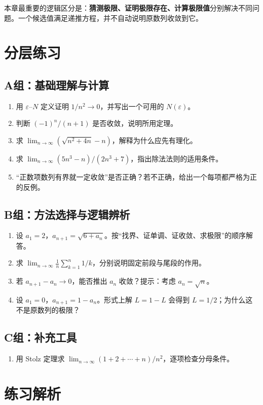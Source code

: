 \documentclass[UTF8,fontset=fandol,12pt,oneside,openany]{ctexrep}
\theoremstyle{definition}
\begin{document}
本章最重要的逻辑区分是：\textbf{猜测极限、证明极限存在、计算极限值}分别解决不同问题。一个候选值满足递推方程，并不自动说明原数列收敛到它。


\section{分层练习}
\subsection*{A组：基础理解与计算}
\begin{enumerate}[label=A\arabic*.]
\item 用 $\varepsilon$--$N$ 定义证明 $1/n^2\to0$，并写出一个可用的 $N(\varepsilon)$。
\item 判断 $(-1)^n/(n+1)$ 是否收敛，说明所用定理。
\item 求 $\lim_{n\to\infty}(\sqrt{n^2+4n}-n)$，解释为什么应先有理化。
\item 求 $\lim_{n\to\infty}(5n^3-n)/(2n^3+7)$，指出除法法则的适用条件。
\item “正数项数列有界就一定收敛”是否正确？若不正确，给出一个每项都严格为正的反例。
\end{enumerate}
\subsection*{B组：方法选择与逻辑辨析}
\begin{enumerate}[label=B\arabic*.]
\item 设 $a_1=2$，$a_{n+1}=\sqrt{6+a_n}$。按“找界、证单调、证收敛、求极限”的顺序解答。
\item 求 $\lim_{n\to\infty}\frac1n\sum_{k=1}^n1/k$，分别说明固定前段与尾段的作用。
\item 若 $a_{n+1}-a_n\to0$，能否推出 $a_n$ 收敛？提示：考虑 $a_n=\sqrt n$。
\item 设 $a_1=0$，$a_{n+1}=1-a_n$。形式上解 $L=1-L$ 会得到 $L=1/2$；为什么这不是原数列的极限？
\end{enumerate}
\subsection*{C组：补充工具}
\begin{enumerate}[label=C\arabic*.]
\item 用 Stolz 定理求 $\lim_{n\to\infty}(1+2+\cdots+n)/n^2$，逐项检查分母条件。
\end{enumerate}

\section{练习解析}
\end{document}
